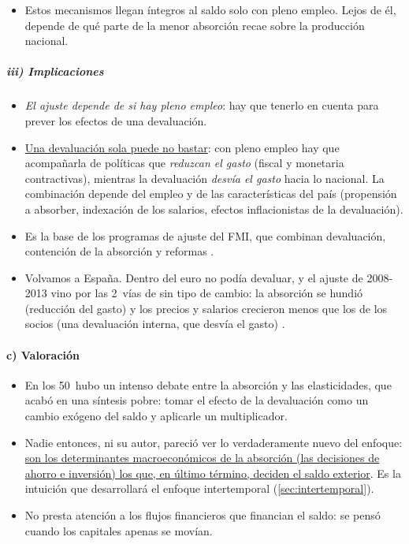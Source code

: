\documentclass[11pt]{article}
\begin{document}
\begin{itemize}
\begin{itemize}
  \item la \emph{redistribución de los salarios a los beneficios}, si los salarios no están indexados y los perceptores de beneficios ahorran más;
  \item la \emph{ilusión monetaria}, si los agentes reaccionan a los precios y no a su renta real.
  \end{itemize}
\item Estos mecanismos llegan íntegros al saldo solo con pleno empleo. Lejos de él, depende de qué parte de la menor absorción recae sobre la producción nacional.
\end{itemize}

\subparagraph{iii) Implicaciones}

\begin{itemize}
\item \emph{El ajuste depende de si hay pleno empleo}: hay que tenerlo en cuenta para prever los efectos de una devaluación.
\item \uline{Una devaluación sola puede no bastar}: con pleno empleo hay que acompañarla de políticas que \emph{reduzcan el gasto} (fiscal y monetaria contractivas), mientras la devaluación \emph{desvía el gasto} hacia lo nacional\nocite{Johnson1958}. La combinación depende del empleo y de las características del país (propensión a absorber, indexación de los salarios, efectos inflacionistas de la devaluación).
\item Es la base de los programas de ajuste del FMI, que combinan devaluación, contención de la absorción y reformas .
\item Volvamos a España. Dentro del euro no podía devaluar, y el ajuste de 2008-2013 vino por las 2~vías de  sin tipo de cambio: la absorción se hundió (reducción del gasto) y los precios y salarios crecieron menos que los de los socios (una devaluación interna, que desvía el gasto)\nocite{BdE2026BE17}  .
\end{itemize}

\paragraph{c) Valoración}

\begin{itemize}
\item En los 50~hubo un intenso debate entre la absorción y las elasticidades, que acabó en una síntesis pobre: tomar el efecto de la devaluación como un cambio exógeno del saldo y aplicarle un multiplicador.
\item Nadie entonces, ni su autor, pareció ver lo verdaderamente nuevo del enfoque: \uline{son los determinantes macroeconómicos de la absorción (las decisiones de ahorro e inversión) los que, en último término, deciden el saldo exterior}. Es la intuición que desarrollará el enfoque intertemporal (\ref{sec:intertemporal}).
\item No presta atención a los flujos financieros que financian el saldo: se pensó cuando los capitales apenas se movían.
\end{itemize}
\end{document}
